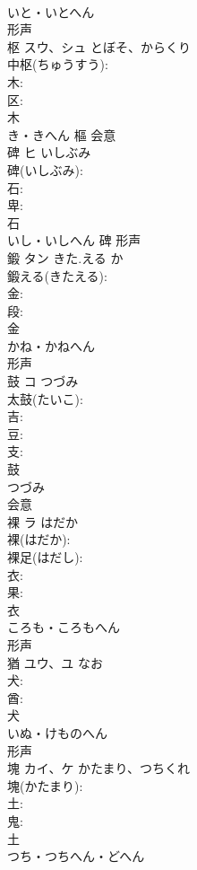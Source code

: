 \documentclass[8pt]{extreport}
\begin{document}
\begin{CJK}{UTF8}{min}
\\	いと・いとへん	
\\	形声 
\\	枢	スウ、シュ	とぼそ、からくり		
\\	中枢(ちゅうすう): 
\\	木: 
\\	区: 
\\	木	
\\	き・きへん	樞	会意 
\\	碑	ヒ	いしぶみ		
\\	碑(いしぶみ): 
\\	石: 
\\	卑: 
\\	石	
\\	いし・いしへん	碑	形声 
\\	鍛	タン	きた.える	か	
\\	鍛える(きたえる): 
\\	金: 
\\	段: 
\\	金	
\\	かね・かねへん	
\\	形声 
\\	鼓	コ	つづみ		
\\	太鼓(たいこ): 
\\	吉: 
\\	豆: 
\\	支: 
\\	鼓	
\\	つづみ	
\\	会意 
\\	裸	ラ	はだか		
\\	裸(はだか): 
\\	裸足(はだし): 
\\	衣: 
\\	果: 
\\	衣	
\\	ころも・ころもへん	
\\	形声 
\\	猶	ユウ、ユ	なお		
\\	犬: 
\\	酋: 
\\	犬	
\\	いぬ・けものへん	
\\	形声 
\\	塊	カイ、ケ	かたまり、つちくれ		
\\	塊(かたまり): 
\\	土: 
\\	鬼: 
\\	土	
\\	つち・つちへん・どへん	

\end{CJK}
\end{document}
